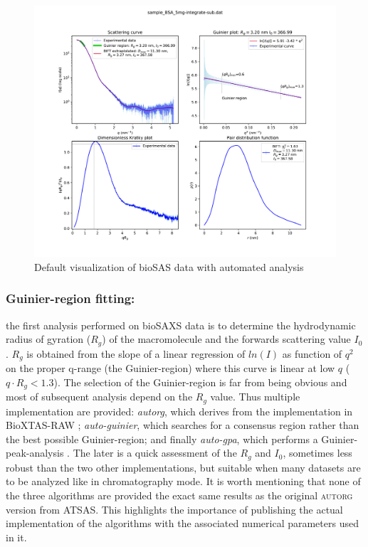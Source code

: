 \documentclass[preprint]{iucr}              %
\begin{document}
\begin{figure}
\label{plot}
\begin{center}
\includegraphics[width=12cm]{Figure_1}
\caption{Default visualization of bioSAS data with automated analysis}
\end{center}
\end{figure}


\subsubsection{Guinier-region fitting:}
the first analysis performed on bioSAXS data is to determine the hydrodynamic radius of gyration ($R_g$) of the macromolecule and the forwards scattering value $I_0$.
$R_g$ is obtained from the slope of a linear regression of $ln(I)$ as function of $q^2$ on the proper q-range (the Guinier-region) where this curve is linear at low $q$ ($q \cdot R_g<1.3$).
The selection of the Guinier-region is far from being obvious and most of subsequent analysis depend on the $R_g$ value.
Thus multiple implementation are provided: \textit{autorg}, which derives from the implementation in BioXTAS-RAW \cite{bioxtasraw}; \textit{auto-guinier}, which searches for a consensus region rather than the best possible Guinier-region; and finally \textit{auto-gpa}, which performs a Guinier-peak-analysis \cite{gpa}. 
The later is a quick assessment of the $R_g$ and $I_0$, sometimes less robust than the two other implementations, but suitable when many datasets are to be analyzed like in chromatography mode.
It is worth mentioning that none of the three algorithms are provided the exact same results as the original \textsc{autorg} \cite{ATSAS2} version from ATSAS. 
This highlights the importance of publishing the actual implementation of the algorithms with the associated numerical parameters used in it.
  
\end{document}
